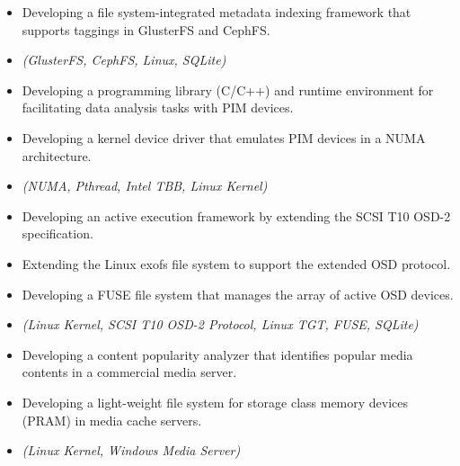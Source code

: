 \begin{itemize}
 \item {Developing a file system-integrated metadata indexing framework that supports taggings in GlusterFS and CephFS.}
 \item {\it\small (GlusterFS, CephFS, Linux, SQLite)}
\end{itemize}

\begin{itemize}
    \item {Developing a programming library (C/C++) and runtime environment for
             facilitating data analysis tasks with PIM devices.}
    \item {Developing a kernel device driver that emulates PIM devices in a NUMA architecture.}
    \item {\it\small(NUMA, Pthread, Intel TBB, Linux Kernel)}
\end{itemize}

\begin{itemize}
 \item {Developing an active execution framework by extending the SCSI T10 OSD-2
       specification.}
 \item {Extending the Linux exofs file system to support the extended OSD protocol.}
 \item {Developing a FUSE file system that manages the array of active OSD devices.}
 \item {\it\small(Linux Kernel, SCSI T10 OSD-2 Protocol, Linux TGT, FUSE, SQLite)}
\end{itemize}

\begin{itemize}
 \item {Developing a content popularity analyzer that identifies
 popular media contents in a commercial media server.}
 \item{Developing a light-weight file system for storage class memory devices (PRAM) in media cache servers.}
 \item{\it\small(Linux Kernel, Windows Media Server)}
\end{itemize}

